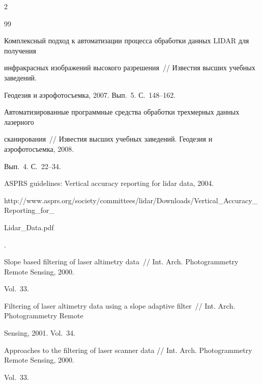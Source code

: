 \begin{multicols}{2}
{{\begin{thebibliography}{99}


Комплексный подход к автоматизации процесса обработки данных LIDAR для получения 

инфракрасных изображений высокого разрешения~// Известия высших учебных заведений. 

Геодезия и аэрофотосъемка, 2007. Вып.~5. С.~148--162.





Автоматизированные программные средства обработки трехмерных данных лазерного 

сканирования~// Известия высших учебных заведений. Геодезия и аэрофотосъемка, 2008. 

Вып.~4. С.~22--34.




ASPRS guidelines: Vertical accuracy reporting for lidar data, 2004. {\sf 

http://www.asprs.org/society/committees/\linebreak lidar/Downloads/Vertical\_Accuracy\_Reporting\_for\_\linebreak 

Lidar\_Data.pdf}.





Slope based filtering of laser altimetry data~// Int. Arch. Photogrammetry Remote Sensing, 2000. 

Vol.~33.





Filtering of laser altimetry data using a slope adaptive filter~// Int. Arch. Photogrammetry Remote 

Sensing, 2001. Vol.~34.





Approaches to the filtering of laser scanner data // Int. Arch. Photogrammetry Remote Sensing, 2000. 

Vol.~33.





\end{thebibliography}}}
\end{multicols}
